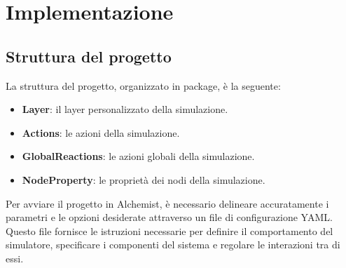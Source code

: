 \chapter{Implementazione}
\section{Struttura del progetto}
La struttura del progetto, organizzato in package, è la seguente:
\begin{itemize}
    \item \textbf{Layer}: il layer personalizzato della simulazione.
    \item \textbf{Actions}: le azioni della simulazione.
    \item \textbf{GlobalReactions}: le azioni globali della simulazione.
    \item \textbf{NodeProperty}: le proprietà dei nodi della simulazione.
\end{itemize}
Per avviare il progetto in Alchemist, è necessario delineare accuratamente i parametri
e le opzioni desiderate attraverso un file di configurazione YAML\@. Questo file fornisce
le istruzioni necessarie per definire il comportamento del simulatore, specificare
i componenti del sistema e regolare le interazioni tra di essi.
\clearpage
